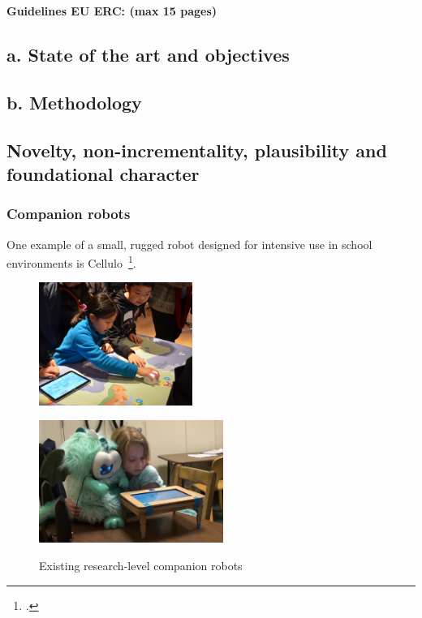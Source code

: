 \documentclass[]{article}
\newcommand{\eu}[1]{{\color{teal}\textbf{Guidelines EU ERC: #1}}}
\begin{document}
\eu{(max 15 pages)}

\hypertarget{a.-state-of-the-art-and-objectives}{%
\subsection{a. State of the art and
objectives}\label{a.-state-of-the-art-and-objectives}}

\hypertarget{b.-methodology}{%
\subsection{b. Methodology}\label{b.-methodology}}

\subsection{Novelty, non-incrementality, plausibility and foundational character}

\subsubsection{Companion robots}

One example of a small, rugged robot designed for intensive use in school
environments is Cellulo~\footcite{ozgur2017cellulo}.

\begin{figure}[!htbp]
    \begin{minipage}[b]{.3\linewidth}
        \centering\includegraphics[height=4cm]{figs/cellulo.jpg}
        \label{fig:cellulo}
    \end{minipage}%
    \hspace{0.5cm}
    \begin{minipage}[b]{.3\linewidth}
        \centering
        \includegraphics[height=4cm]{figs/tega.jpg}
        \label{fig:tega}
    \end{minipage}
    \hspace{0.5cm}
    \begin{minipage}[b]{.3\linewidth}
        \centering
        \label{fig:ono}
    \end{minipage}
    \caption{Existing research-level companion robots}\label{fig:research-robots}
\end{figure}
\end{document}
